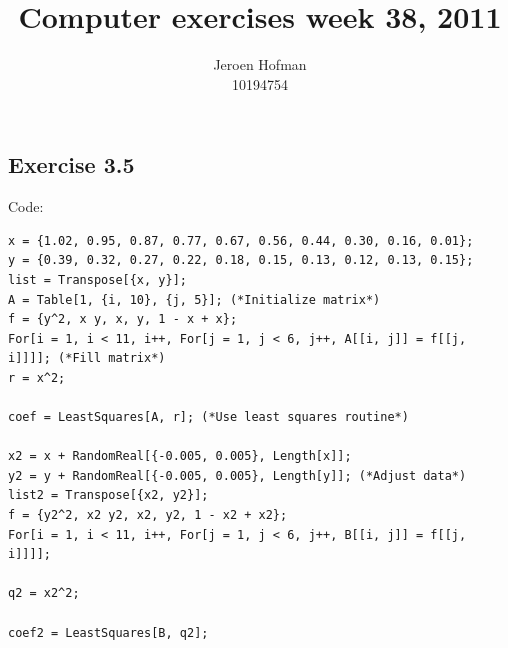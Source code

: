 \documentclass[10pt,a4paper]{article}
\begin{document}
\lstset{language=Mathematica,breaklines=true}

\author{Jeroen Hofman\\
		10194754\\
		}
\title{Computer exercises week 38, 2011\\
		}
\date{}
\maketitle

\subsection*{Exercise 3.5}

Code:
\begin{lstlisting}
x = {1.02, 0.95, 0.87, 0.77, 0.67, 0.56, 0.44, 0.30, 0.16, 0.01};
y = {0.39, 0.32, 0.27, 0.22, 0.18, 0.15, 0.13, 0.12, 0.13, 0.15};
list = Transpose[{x, y}];
A = Table[1, {i, 10}, {j, 5}]; (*Initialize matrix*)
f = {y^2, x y, x, y, 1 - x + x};
For[i = 1, i < 11, i++, For[j = 1, j < 6, j++, A[[i, j]] = f[[j, i]]]]; (*Fill matrix*)
r = x^2;

coef = LeastSquares[A, r]; (*Use least squares routine*)

x2 = x + RandomReal[{-0.005, 0.005}, Length[x]];
y2 = y + RandomReal[{-0.005, 0.005}, Length[y]]; (*Adjust data*)
list2 = Transpose[{x2, y2}];
f = {y2^2, x2 y2, x2, y2, 1 - x2 + x2};
For[i = 1, i < 11, i++, For[j = 1, j < 6, j++, B[[i, j]] = f[[j, i]]]];

q2 = x2^2;

coef2 = LeastSquares[B, q2];

\end{lstlisting}
\end{document}
